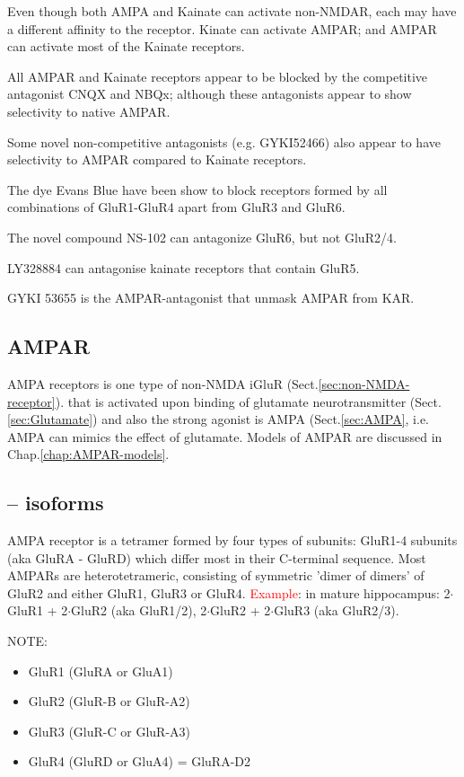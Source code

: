 Even though both AMPA and Kainate can activate non-NMDAR, each may have a
different affinity to the receptor. Kinate can activate AMPAR; and AMPAR can
activate most of the Kainate receptors.

All AMPAR and Kainate receptors appear to be blocked by the competitive
antagonist CNQX and NBQx; although these antagonists appear to show selectivity
to native AMPAR.

Some novel non-competitive antagonists (e.g. GYKI52466) also appear to have
selectivity to AMPAR compared to Kainate receptors.

The dye Evans Blue have been show to block receptors formed by all combinations
of GluR1-GluR4 apart from GluR3 and GluR6.

The novel compound NS-102 can antagonize GluR6, but not GluR2/4.

LY328884 can antagonise kainate receptors that contain GluR5.

GYKI 53655 is the AMPAR-antagonist that unmask AMPAR from KAR.


\subsection{AMPAR}
\label{sec:AMPAR}

AMPA receptors is one type of non-NMDA iGluR (Sect.\ref{sec:non-NMDA-receptor}).
that is activated upon binding of glutamate neurotransmitter
(Sect.\ref{sec:Glutamate}) and also the strong agonist is
AMPA (Sect.\ref{sec:AMPA}, i.e. AMPA can mimics the effect of glutamate. Models
of AMPAR are discussed in Chap.\ref{chap:AMPAR-models}.

\subsection{-- isoforms}
\label{sec:AMPAR-isoforms}

AMPA receptor is a tetramer formed by four types of subunits:
GluR1-4 subunits (aka GluRA - GluRD) which differ most in their C-terminal
sequence. Most AMPARs are heterotetrameric, consisting of symmetric 'dimer of
dimers' of GluR2 and either GluR1, GluR3 or GluR4. \textcolor{red}{Example}: in
mature hippocampus:   2$\cdot$GluR1 + 2$\cdot$GluR2 (aka GluR1/2), 2$\cdot$GluR2
+ 2$\cdot$GluR3  (aka GluR2/3).

NOTE:
\begin{itemize}
  \item GluR1 (GluRA or GluA1)
  \item GluR2 (GluR-B or GluR-A2)
  \item GluR3 (GluR-C or GluR-A3)
  \item GluR4 (GluRD or GluA4) = GluRA-D2
\end{itemize}

